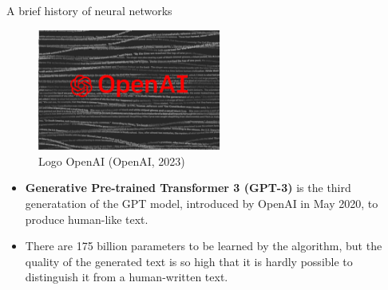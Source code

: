 \begin{vbframe}{A brief history of neural networks}
\begin{figure}
\centering
\includegraphics[width=6cm]{figure/gpt3.png}
\caption{Logo OpenAI (OpenAI, 2023)}
\end{figure}
\footnotesize
\begin{itemize}
\item\textbf{Generative Pre-trained Transformer 3 (GPT-3)} is the third generatation of the GPT model, introduced by OpenAI in May 2020, to produce human-like text.
\vspace{.1cm}
\item There are 175 billion parameters to be learned by the algorithm, but the quality of the generated text is so high that it is hardly possible to distinguish it from a human-written text.
\end{itemize}
\end{vbframe}
